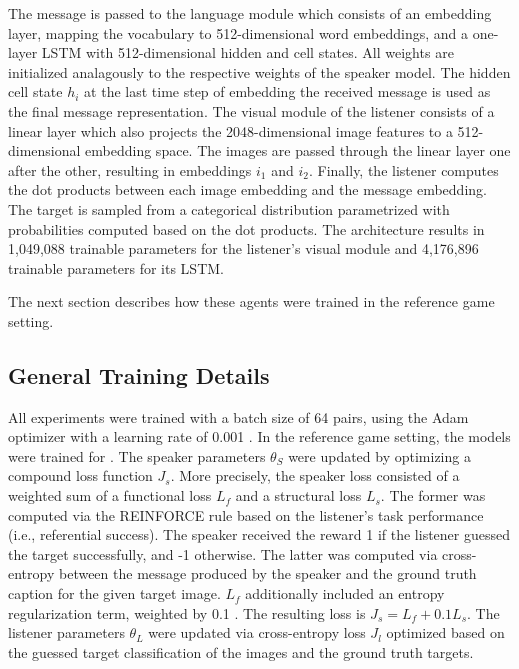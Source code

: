The message is passed to the language module which consists of an embedding layer, mapping the vocabulary to 512-dimensional word embeddings, and a one-layer LSTM with 512-dimensional hidden and cell states. All weights are initialized analagously to the respective weights of the speaker model. The hidden cell state $h_i$ at the last time step of embedding the received message is used as the final message representation. 
The visual module of the listener consists of a linear layer which also projects the 2048-dimensional image features to a 512-dimensional embedding space. The images are passed through the linear layer one after the other, resulting in embeddings $i_1$ and $i_2$.  Finally, the listener computes the dot products between each image embedding and the message embedding. The target is sampled from a categorical distribution parametrized with probabilities computed based on the dot products.  
The architecture results in 1,049,088 trainable parameters for the listener's visual module and 4,176,896 trainable parameters for its LSTM.

The next section describes how these agents were trained in the reference game setting.


\subsection{General Training Details}

All experiments were trained with a batch size of 64 pairs, using the Adam optimizer with a learning rate  of 0.001 \parencite{kingma2014adam}. In the reference game setting, the models were trained for . 
The speaker parameters $\theta_S$ were updated by optimizing a compound loss function $J_s$. More precisely, the speaker loss consisted of a weighted sum of a functional loss $L_f$ and a structural loss $L_s$. The former was computed via the REINFORCE rule based on the listener's task performance (i.e., referential success). The speaker received the reward 1 if the listener guessed the target successfully, and -1 otherwise. The latter was computed via cross-entropy between the message produced by the speaker and the ground truth caption for the given target image. $L_f$ additionally included an entropy regularization term, weighted by 0.1 . The resulting loss is $J_s = L_f + 0.1 L_s$. 
The listener parameters $\theta_L$ were updated via cross-entropy loss $J_l$ optimized based on the guessed target classification of the images and the ground truth targets. 


